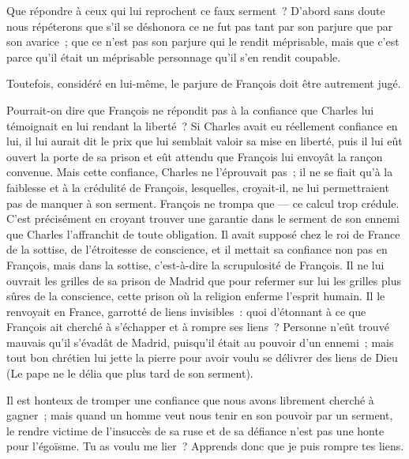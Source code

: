 \documentclass[french,twoside]{book} %
\begin{document}
Que répondre à ceux qui lui reprochent ce faux serment ? D’abord sans doute nous répéterons que s’il se déshonora ce ne fut pas tant par son parjure que par son avarice ; que ce n’est pas son parjure qui le rendit méprisable, mais que c’est parce qu’il était un méprisable personnage qu’il s’en rendit coupable.\par
Toutefois, considéré en lui-même, le parjure de François doit être autrement jugé.\par
Pourrait-on dire que François ne répondit pas à la confiance que Charles lui témoignait en lui rendant la liberté ? Si Charles avait eu réellement confiance en lui, il lui aurait dit le prix que lui semblait valoir sa mise en liberté, puis il lui eût ouvert la porte de sa prison et eût attendu que François lui envoyât la rançon convenue. Mais cette confiance, Charles ne l’éprouvait pas ; il ne se fiait qu’à la faiblesse et à la crédulité de François, lesquelles, croyait-il, ne lui permettraient pas de manquer à son serment. François ne trompa que — ce calcul trop crédule. C’est précisément en croyant trouver une garantie dans le serment de son ennemi que Charles l’affranchit de toute obligation. Il avait supposé chez le roi de France de la sottise, de l’étroitesse de conscience, et il mettait sa confiance non pas en François, mais dans la sottise, c’est-à-dire la scrupulosité de François. Il ne lui ouvrait les grilles de sa prison de Madrid que pour refermer sur lui les grilles plus sûres de la conscience, cette prison où la religion enferme l’esprit humain. Il le renvoyait en France, garrotté de liens invisibles : quoi d’étonnant à ce que François ait cherché à s’échapper et à rompre ses liens ? Personne n’eût trouvé mauvais qu’il s’évadât de Madrid, puisqu’il était au pouvoir d’un ennemi ; mais tout bon chrétien lui jette la pierre pour avoir  voulu se délivrer des liens de Dieu (Le pape ne le délia que plus tard de son serment).\par
Il est honteux de tromper une confiance que nous avons librement cherché à gagner ; mais quand un homme veut nous tenir en son pouvoir par un serment, le rendre victime de l’insuccès de sa ruse et de sa défiance n’est pas une honte pour l’égoïsme. Tu as voulu me lier ? Apprends donc que je puis rompre tes liens.\par
\end{document}
